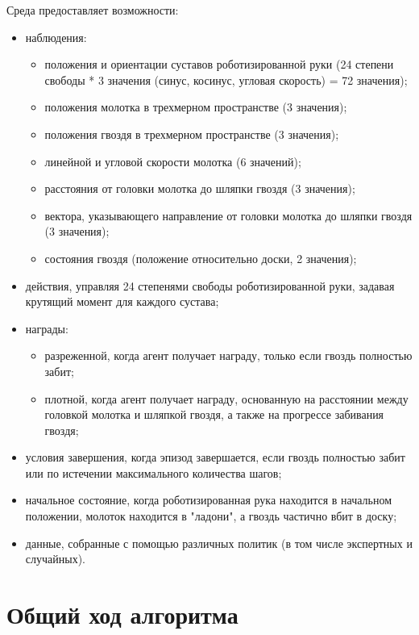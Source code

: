 Среда предоставляет возможности:
\begin{itemize}
    \item наблюдения:
    \begin{itemize}
        \item положения и ориентации суставов роботизированной руки (24 степени свободы * 3 значения (синус, косинус, угловая скорость) = 72 значения);
        \item положения молотка в трехмерном пространстве (3 значения);
        \item положения гвоздя в трехмерном пространстве (3 значения);
        \item линейной и угловой скорости молотка (6 значений);
        \item расстояния от головки молотка до шляпки гвоздя (3 значения);
        \item вектора, указывающего направление от головки молотка до шляпки гвоздя (3 значения);
        \item состояния гвоздя (положение относительно доски, 2 значения);
    \end{itemize}
    \item действия, управляя 24 степенями свободы роботизированной руки, задавая крутящий момент для каждого сустава;
    \item награды:
    \begin{itemize}
        \item разреженной, когда агент получает награду, только если гвоздь полностью забит;
        \item плотной, когда агент получает награду, основанную на расстоянии между головкой молотка и шляпкой гвоздя, а также на прогрессе забивания гвоздя; 
    \end{itemize}
    \item условия завершения, когда эпизод завершается, если гвоздь полностью забит или по истечении максимального количества шагов;
    \item начальное состояние, когда роботизированная рука находится в начальном положении, молоток находится в "ладони", а гвоздь частично вбит в доску;
    \item данные, собранные с помощью различных политик (в том числе экспертных и случайных).
\end{itemize}

\section{Общий ход алгоритма}

